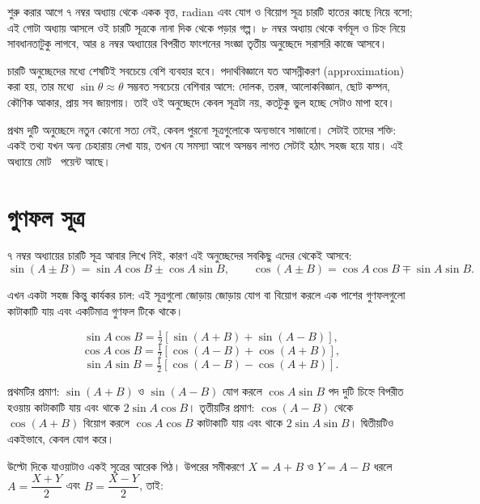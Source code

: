 \documentclass[11pt]{article}
\begin{document}

\noindent
শুরু করার আগে ৭ নম্বর অধ্যায় থেকে একক বৃত্ত, radian এবং যোগ ও বিয়োগ সূত্র
চারটি হাতের কাছে নিয়ে বসো; এই গোটা অধ্যায় আসলে ওই চারটি সূত্রকে নানা দিক
থেকে পড়ার গল্প। ৮ নম্বর অধ্যায় থেকে বর্গমূল ও চিহ্ন নিয়ে সাবধানতাটুকু
লাগবে, আর ৪ নম্বর অধ্যায়ের বিপরীত ফাংশনের সংজ্ঞা তৃতীয় অনুচ্ছেদে সরাসরি
কাজে আসবে।

চারটি অনুচ্ছেদের মধ্যে শেষটিই সবচেয়ে বেশি ব্যবহার হবে। পদার্থবিজ্ঞানে যত
আসন্নীকরণ (approximation) করা হয়, তার মধ্যে $\sin\theta \approx \theta$
সম্ভবত সবচেয়ে বেশিবার আসে: দোলক, তরঙ্গ, আলোকবিজ্ঞান, ছোট কম্পন, কৌণিক আকার,
প্রায় সব জায়গায়। তাই ওই অনুচ্ছেদে কেবল সূত্রটা নয়, কতটুকু ভুল হচ্ছে সেটাও
মাপা হবে।

প্রথম দুটি অনুচ্ছেদে নতুন কোনো সত্য নেই, কেবল পুরনো সূত্রগুলোকে অন্যভাবে সাজানো।
সেটাই তাদের শক্তি: একই তথ্য যখন অন্য চেহারায় লেখা যায়, তখন যে সমস্যা আগে অসম্ভব
লাগত সেটাই হঠাৎ সহজ হয়ে যায়। এই অধ্যায়ে মোট \totalpoints\ পয়েন্ট আছে।

\section{গুণফল সূত্র}

৭ নম্বর অধ্যায়ের চারটি সূত্র আবার লিখে নিই, কারণ এই অনুচ্ছেদের সবকিছু
এদের থেকেই আসবে:
\[
  \sin(A \pm B) = \sin A\cos B \pm \cos A \sin B, \qquad
  \cos(A \pm B) = \cos A\cos B \mp \sin A \sin B .
\]

এখন একটা সহজ কিন্তু কার্যকর চাল: এই সূত্রগুলো জোড়ায় জোড়ায় যোগ বা বিয়োগ করলে
এক পাশের গুণফলগুলো কাটাকাটি যায় এবং একটিমাত্র গুণফল টিকে থাকে।

\begin{idea}
\[
  \sin A\cos B = \tfrac{1}{2}\left[ \sin(A+B) + \sin(A-B) \right] ,
\]
\[
  \cos A\cos B = \tfrac{1}{2}\left[ \cos(A-B) + \cos(A+B) \right] ,
\]
\[
  \sin A\sin B = \tfrac{1}{2}\left[ \cos(A-B) - \cos(A+B) \right] .
\]
\end{idea}

প্রথমটির প্রমাণ: $\sin(A+B)$ ও $\sin(A-B)$ যোগ করলে $\cos A\sin B$ পদ দুটি
চিহ্নে বিপরীত হওয়ায় কাটাকাটি যায় এবং থাকে $2\sin A\cos B$। তৃতীয়টির প্রমাণ:
$\cos(A-B)$ থেকে $\cos(A+B)$ বিয়োগ করলে $\cos A\cos B$ কাটাকাটি যায় এবং থাকে
$2\sin A\sin B$। দ্বিতীয়টিও একইভাবে, কেবল যোগ করে।

উল্টো দিকে যাওয়াটাও একই সূত্রের আরেক পিঠ। উপরের সমীকরণে
$X = A+B$ ও $Y = A-B$ ধরলে $A = \dfrac{X+Y}{2}$ এবং $B = \dfrac{X-Y}{2}$, তাই:
\end{document}
